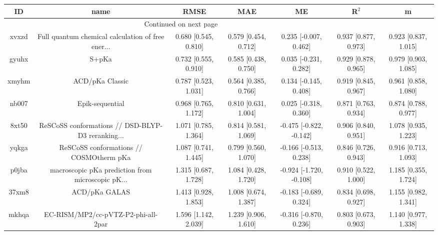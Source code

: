 \documentclass{article}
\begin{document}
\begin{center}
\begin{longtable}{|ccccccc|}
\toprule
    ID &                                               name &                  RMSE &                   MAE &                       ME &                 R$^2$ &                      m \\
\midrule
\endhead
\midrule
\multicolumn{3}{r}{{Continued on next page}} \\
\midrule
\endfoot

\bottomrule
\endlastfoot
 xvxzd &  Full quantum chemical calculation of free ener... &  0.680 [0.545, 0.810] &  0.579 [0.454, 0.712] &    0.235 [-0.007, 0.462] &  0.937 [0.877, 0.973] &   0.923 [0.837, 1.015] \\
 gyuhx &                                              S+pKa &  0.732 [0.555, 0.910] &  0.585 [0.438, 0.750] &    0.035 [-0.231, 0.282] &  0.929 [0.878, 0.965] &   0.979 [0.903, 1.085] \\
 xmyhm &                                    ACD/pKa Classic &  0.787 [0.523, 1.031] &  0.564 [0.385, 0.766] &    0.134 [-0.145, 0.408] &  0.919 [0.845, 0.967] &   0.961 [0.858, 1.080] \\
 nb007 &                                    Epik-sequential &  0.968 [0.765, 1.172] &  0.810 [0.631, 1.004] &    0.025 [-0.318, 0.360] &  0.871 [0.763, 0.934] &   0.874 [0.788, 0.977] \\
 8xt50 &  ReSCoSS conformations // DSD-BLYP-D3 reranking... &  1.071 [0.785, 1.364] &  0.814 [0.581, 1.069] &  -0.475 [-0.822, -0.142] &  0.906 [0.840, 0.951] &   1.078 [0.935, 1.223] \\
 yqkga &            ReSCoSS conformations // COSMOtherm pKa &  1.087 [0.741, 1.445] &  0.799 [0.560, 1.070] &   -0.166 [-0.513, 0.238] &  0.846 [0.726, 0.943] &   0.916 [0.713, 1.093] \\
 p0jba &  macroscopic pKa prediction from microscopic pK... &  1.315 [0.687, 1.728] &  1.084 [0.428, 1.720] &  -0.924 [-1.720, -0.108] &  0.910 [0.522, 1.000] &   1.185 [0.355, 1.724] \\
 37xm8 &                                      ACD/pKa GALAS &  1.413 [0.928, 1.853] &  1.008 [0.674, 1.387] &   -0.183 [-0.689, 0.324] &  0.834 [0.698, 0.927] &   1.155 [0.982, 1.341] \\
 mkhqa &                EC-RISM/MP2/cc-pVTZ-P2-phi-all-2par &  1.596 [1.142, 2.039] &  1.239 [0.906, 1.610] &   -0.316 [-0.870, 0.236] &  0.803 [0.673, 0.903] &   1.140 [0.977, 1.338] \\

\end{longtable}
\end{center}
\end{document}
